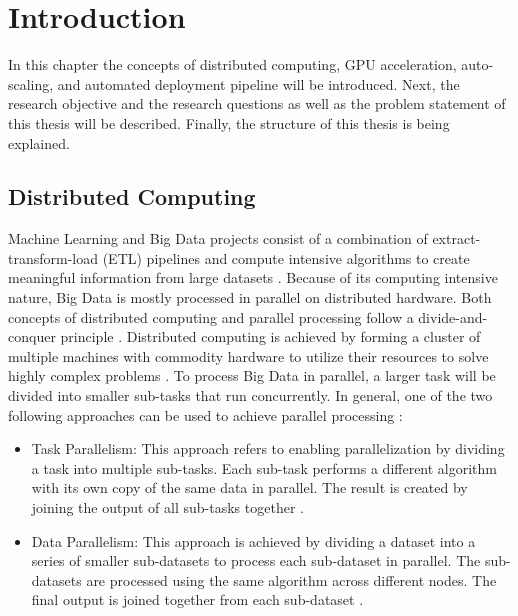 \chapter{Introduction}
\label{chap:01_introduction}

In this chapter the concepts of distributed computing, GPU acceleration, auto-scaling, and automated deployment pipeline will be introduced.
Next, the research objective and the research questions as well as the problem statement of this thesis will be described.
Finally, the structure of this thesis is being explained.


\section{Distributed Computing}
Machine Learning and Big Data projects consist of a combination of extract-transform-load (ETL) pipelines and compute intensive algorithms to create meaningful information from large datasets \cite{Vadapalli2018DevOps}.
Because of its computing intensive nature, Big Data is mostly processed in parallel on distributed hardware.
Both concepts of distributed computing and parallel processing follow a divide-and-conquer principle \cite{Khattak2016BigData}.
Distributed computing is achieved by forming a cluster of multiple machines with commodity hardware to utilize their resources to solve highly complex problems \cite{Ganelin2016Spark}.
To process Big Data in parallel, a larger task will be divided into smaller sub-tasks that run concurrently.
In general, one of the two following approaches can be used to achieve parallel processing \cite{Khattak2016BigData}:
\begin{itemize}
\item Task Parallelism:
This approach refers to enabling parallelization by dividing a task into multiple sub-tasks.
Each sub-task performs a different algorithm with its own copy of the same data in parallel.
The result is created by joining the output of all sub-tasks together \cite{Khattak2016BigData}.

\item Data Parallelism:
This approach is achieved by dividing a dataset into a series of smaller sub-datasets to process each sub-dataset in parallel.
The sub-datasets are processed using the same algorithm across different nodes.
%
The final output is joined together from each sub-dataset \cite{Khattak2016BigData}.
\end{itemize}
